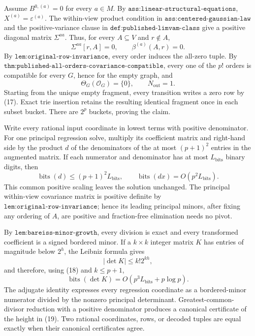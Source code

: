 Assume \(B^{0,(a)}=0\) for every \(a\in M\).  By \(\texttt{ass:linear-structural-equations}\), \(X^{(a)}=\varepsilon^{(a)}\).  The within-view product condition in \(\texttt{ass:centered-gaussian-law}\) and the positive-variance clause in \(\texttt{def:published-limvam-class}\) give a positive diagonal matrix \(\Sigma^{aa}\).  Thus, for every \(A\subseteq V\) and \(r\notin A\),
\[
 \Sigma^{aa}[r,A]=0,
 \qquad \beta^{(a)}(A,r)=0.
 \tag{17}
\]
By \(\texttt{lem:original-row-invariance}\), every order induces the all-zero tuple.  By \(\texttt{thm:published-all-orders-covariance-compatible}\), every one of the \(p!\) orders is compatible for every \(G\), hence for the empty graph, and
\[
 \Theta_G(\mathcal O_G)=\{0\},
 \qquad N_{\mathrm{out}}=1.
\]
Starting from the unique empty fragment, every transition writes a zero row by (17).  Exact trie insertion retains the resulting identical fragment once in each subset bucket.  There are \(2^p\) buckets, proving the claim.

Write every rational input coordinate in lowest terms with positive denominator.  For one principal regression solve, multiply its coefficient matrix and right-hand side by the product \(d\) of the denominators of the at most \((p+1)^2\) entries in the augmented matrix.  If each numerator and denominator has at most \(L_{\mathrm{bits}}\) binary digits, then
\[
 \operatorname{bits}(d)\le(p+1)^2L_{\mathrm{bits}},
 \qquad \operatorname{bits}(dx)=O(p^2L_{\mathrm{bits}}).
 \tag{18}
\]
This common positive scaling leaves the solution unchanged.  The principal within-view covariance matrix is positive definite by \(\texttt{lem:original-row-invariance}\); hence its leading principal minors, after fixing any ordering of \(A\), are positive and fraction-free elimination needs no pivot.

By \(\texttt{lem:bareiss-minor-growth}\), every division is exact and every transformed coefficient is a signed bordered minor.  If a \(k\times k\) integer matrix \(K\) has entries of magnitude below \(2^h\), the Leibniz formula gives
\[
 |\det K|\le k!2^{kh},
\]
and therefore, using (18) and \(k\le p+1\),
\[
 \operatorname{bits}(\det K)
 =O(p^3L_{\mathrm{bits}}+p\log p).
 \tag{19}
\]
The adjugate identity expresses every regression coordinate as a bordered-minor numerator divided by the nonzero principal determinant.  Greatest-common-divisor reduction with a positive denominator produces a canonical certificate of the height in (19).  Two rational coordinates, rows, or decoded tuples are equal exactly when their canonical certificates agree.

